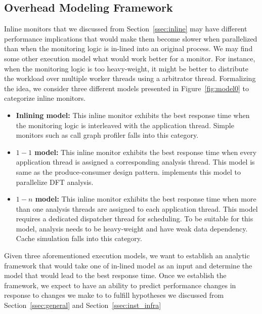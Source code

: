 \subsection{Overhead Modeling Framework}

Inline monitors that we discussed from Section~\ref{ssec:inline} may have
different performance implications that would make them become slower when
parallelized than when the monitoring logic is in-lined into an original
process. We may find some other execution model what would work better for a
monitor. For instance, when the monitoring logic is too heavy-weight, it might
be better to distribute the workload over multiple worker threads
using a arbitrator thread. Formalizing the idea, we consider three different
models presented in Figure~\ref{fig:model0} to categorize inline monitors.

\begin{itemize}

    \item{{\bf Inlining model:} This inline monitor exhibits the best response time
            when the monitoring logic is interleaved with the application
    thread. Simple monitors such as call graph profiler falls into this
    category.}

    \item{{\bf $1-1$ model:} This inline monitor exhibits the best response time when
            every application thread  is assigned a corresponding analysis thread. This
    model is same as the produce-consumer design pattern. \sreplica implements this
    model to parallelize DFT analysis.}

    \item{{\bf $1-n$ model:} This inline monitor exhibits the best response time when
            more than one analysis threads are assigned to each application
    thread. This model requires a dedicated dispatcher thread for scheduling. To
    be suitable for this model, analysis needs to be heavy-weight and have
    weak data dependency. Cache simulation falls into this category.}

\end{itemize}

%
Given three aforementioned execution models, we want to establish an analytic
framework that would take one of in-lined model as an input and determine the
model that would lead to the best response time. Once we establish the
framework, we expect to have an ability to predict performance changes in
response to changes we make to \sreplica to fulfill hypotheses we discussed
from Section~\ref{ssec:general} and Section~\ref{ssec:inst_infra} 

